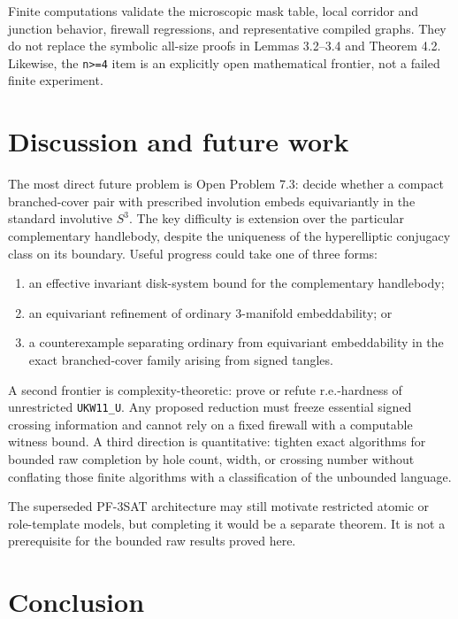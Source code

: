 \documentclass[11pt]{article}
\begin{document}
Finite computations validate the microscopic mask table, local corridor and
junction behavior, firewall regressions, and representative compiled graphs.
They do not replace the symbolic all-size proofs in Lemmas 3.2--3.4 and
Theorem 4.2.  Likewise, the \texttt{n>=4} item is an explicitly open mathematical
frontier, not a failed finite experiment.

\section{Discussion and future work}

The most direct future problem is Open Problem 7.3: decide whether a compact
branched-cover pair with prescribed involution embeds equivariantly in the
standard involutive $S^3$.  The key difficulty is extension over the
particular complementary handlebody, despite the uniqueness of the
hyperelliptic conjugacy class on its boundary.  Useful progress could take one
of three forms:

\begin{enumerate}
\item an effective invariant disk-system bound for the complementary handlebody;
\item an equivariant refinement of ordinary 3-manifold embeddability; or
\item a counterexample separating ordinary from equivariant embeddability in the
   exact branched-cover family arising from signed tangles.
\end{enumerate}

A second frontier is complexity-theoretic: prove or refute r.e.-hardness of
unrestricted \texttt{UKW11\_U}.  Any proposed reduction must freeze essential signed
crossing information and cannot rely on a fixed firewall with a computable
witness bound.  A third direction is quantitative: tighten exact algorithms
for bounded raw completion by hole count, width, or crossing number without
conflating those finite algorithms with a classification of the unbounded
language.

The superseded PF-3SAT architecture may still motivate restricted atomic or
role-template models, but completing it would be a separate theorem.  It is
not a prerequisite for the bounded raw results proved here.

\section{Conclusion}
\end{document}
